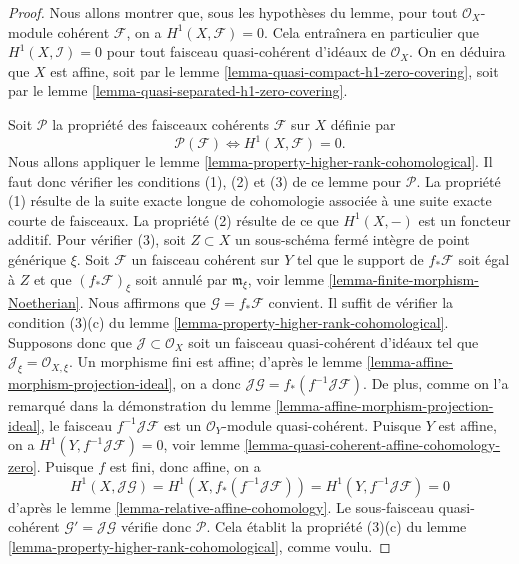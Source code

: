 \begin{proof}
Nous allons montrer que, sous les hypothèses du lemme, pour tout
$\mathcal{O}_X$-module cohérent $\mathcal{F}$, on a $H^1(X, \mathcal{F}) = 0$.
Cela entraînera en particulier que $H^1(X, \mathcal{I}) = 0$
pour tout faisceau quasi-cohérent d'idéaux de $\mathcal{O}_X$. On en
déduira que $X$ est affine, soit par le
lemme \ref{lemma-quasi-compact-h1-zero-covering}, soit
par le lemme \ref{lemma-quasi-separated-h1-zero-covering}.

\medskip\noindent
Soit $\mathcal{P}$ la propriété des faisceaux cohérents
$\mathcal{F}$ sur $X$ définie par
$$
\mathcal{P}(\mathcal{F}) \Leftrightarrow H^1(X, \mathcal{F}) = 0.
$$
Nous allons appliquer le lemme \ref{lemma-property-higher-rank-cohomological}.
Il faut donc vérifier les conditions (1), (2) et (3) de ce lemme pour $\mathcal{P}$.
La propriété (1) résulte de la suite exacte longue de cohomologie associée à
une suite exacte courte de faisceaux. La propriété (2) résulte de ce que
$H^1(X, -)$ est un foncteur additif. Pour vérifier (3), soit $Z \subset X$ un
sous-schéma fermé intègre de point générique $\xi$.
Soit $\mathcal{F}$ un faisceau cohérent sur $Y$ tel que
le support de $f_*\mathcal{F}$ soit égal à $Z$
et que $(f_*\mathcal{F})_\xi$ soit annulé par $\mathfrak m_\xi$,
voir lemme \ref{lemma-finite-morphism-Noetherian}. Nous affirmons
que $\mathcal{G} = f_*\mathcal{F}$ convient. Il suffit de vérifier la
condition (3)(c) du lemme \ref{lemma-property-higher-rank-cohomological}.
Supposons donc que $\mathcal{J} \subset \mathcal{O}_X$ soit un
faisceau quasi-cohérent d'idéaux tel que
$\mathcal{J}_\xi = \mathcal{O}_{X, \xi}$.
Un morphisme fini est affine; d'après le
lemme \ref{lemma-affine-morphism-projection-ideal}, on a donc
$\mathcal{J}\mathcal{G} = f_*(f^{-1}\mathcal{J}\mathcal{F})$.
De plus, comme on l'a remarqué dans la démonstration du
lemme \ref{lemma-affine-morphism-projection-ideal}, le faisceau
$f^{-1}\mathcal{J}\mathcal{F}$ est un $\mathcal{O}_Y$-module quasi-cohérent.
Puisque $Y$ est affine, on a $H^1(Y, f^{-1}\mathcal{J}\mathcal{F}) = 0$,
voir lemme \ref{lemma-quasi-coherent-affine-cohomology-zero}.
Puisque $f$ est fini, donc affine, on a
$$
H^1(X, \mathcal{J}\mathcal{G}) =
H^1(X, f_*(f^{-1}\mathcal{J}\mathcal{F})) =
H^1(Y, f^{-1}\mathcal{J}\mathcal{F}) = 0
$$
d'après le lemme \ref{lemma-relative-affine-cohomology}.
Le sous-faisceau quasi-cohérent $\mathcal{G}' = \mathcal{J}\mathcal{G}$
vérifie donc $\mathcal{P}$. Cela établit la propriété (3)(c) du
lemme \ref{lemma-property-higher-rank-cohomological}, comme voulu.
\end{proof}












